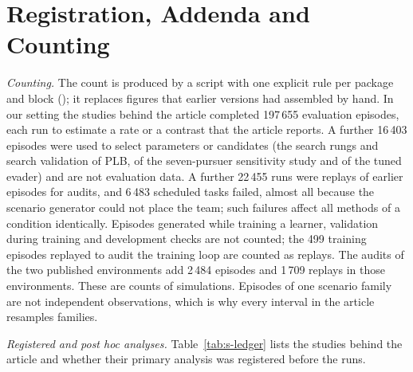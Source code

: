 \documentclass[preprint,12pt]{elsarticle}
\begin{document}
\section{Registration, Addenda and Counting}\label{sec:s-ledger}

\emph{Counting.} The count is produced by a script with one explicit rule per package and block
(); it replaces figures that earlier versions had assembled by hand. In our
setting the studies behind the article completed 197\,655 evaluation episodes, each run to estimate a rate or a
contrast that the article reports. A further 16\,403 episodes were used to select parameters or candidates (the
search rungs and search validation of PLB, of the seven-pursuer sensitivity study and of the tuned evader) and are
not evaluation data. A further 22\,455 runs were replays of earlier episodes for audits, and 6\,483 scheduled tasks
failed, almost all because the scenario generator could not place the team; such failures affect all methods of a
condition identically. Episodes generated while training a learner, validation during training and development
checks are not counted; the 499 training episodes replayed to audit the training loop are counted as replays. The
audits of the two published environments add 2\,484 episodes and 1\,709 replays in those environments. These are
counts of simulations. Episodes of one scenario family are not independent observations,
which is why every interval in the article resamples families.

\emph{Registered and post hoc analyses.} Table~\ref{tab:s-ledger} lists the studies behind the article and whether
their primary analysis was registered before the runs.
\end{document}

